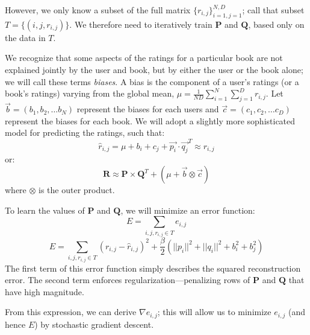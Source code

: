 \documentclass[11pt]{amsart}
\newcommand{\mat}[1]{\mathbf{#1}}
\begin{document}
However, we only know a subset of the full matrix $\{r_{i,j}\}_{i=1, j=1}^{N,D}$; call that subset $T = \{(i, j, r_{i,j})\}$. We therefore need to iteratively train $\mat{P}$ and $\mat{Q}$, based only on the data in $T$. 

We recognize that some aspects of the ratings for a particular book are not explained jointly by the user and book, but by either the user or the book alone; we will call these terms \emph{biases}. A bias is the component of a user's ratings (or a book's ratings) varying from the global mean, $\mu = \frac{1}{ND} \sum_{i=1}^{N}\sum_{j=1}^{D} r_{i,j}$. Let $\vec{b} = (b_1, b_2, \ldots b_N)$ represent the biases for each users and $\vec{c} = (c_1, c_2, \ldots c_D)$ represent the biases for each book. We will adopt a slightly more sophisticated model for predicting the ratings, such that:
$$\hat{r}_{i,j} = \mu + b_i + c_j + \vec{p_i} \cdot \vec{q_j}^T \approx r_{i,j}$$
or:
$$\mat{R} \approx \mat{P} \times \mat{Q}^T + (\mu + \vec{b} \otimes \vec{c})$$
where $\otimes$ is the outer product.

To learn the values of $\mat{P}$ and $\mat{Q}$, we will minimize an error function:
$$E = \sum_{i,j,r_{i,j} \in T} e_{i,j} $$
$$E = \sum_{i,j,r_{i,j} \in T} \left(r_{i,j} - \hat{r}_{i,j}\right)^2 + \frac{\beta}{2} \left( ||p_i||^2 + ||q_i||^2 + b_i^2 + b_j^2 \right) $$
The first term of this error function simply describes the squared reconstruction error. The second term enforces regularization---penalizing rows of $\mat{P}$ and $\mat{Q}$ that have high magnitude. 

From this expression, we can derive $\nabla e_{i,j}$; this will allow us to minimize $e_{i,j}$ (and hence $E$) by stochastic gradient descent.
\end{document}
